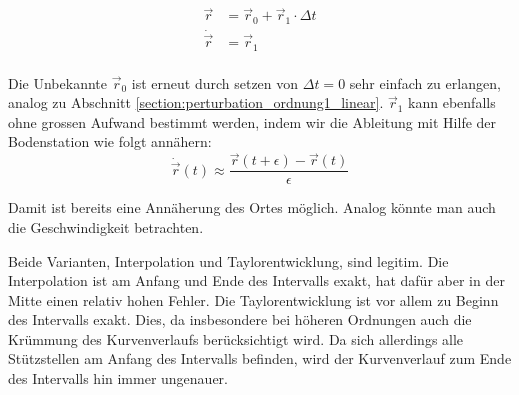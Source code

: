 \begin{equation}
\label{eq:ordnung1_taylor_ansatz}
\begin{aligned}
\vec{r} &=  \vec{r}_0 + \vec{r}_1 \cdot \Delta t \\
\dot{\vec{r}} &= \vec{r}_1 \\
\end{aligned}
\end{equation}

Die Unbekannte $\vec{r}_0$ ist erneut durch setzen von $\Delta t = 0$ sehr einfach zu erlangen, analog zu Abschnitt \ref{section:perturbation_ordnung1_linear}.
$\vec{r}_1$ kann ebenfalls ohne grossen Aufwand bestimmt werden, indem wir die Ableitung mit Hilfe der Bodenstation wie folgt annähern:
\[
\dot{\vec{r}}(t) \approx \frac{\vec{r}(t+\epsilon) - \vec{r}(t)}{\epsilon}
\]

Damit ist bereits eine Annäherung des Ortes möglich.
Analog könnte man auch die Geschwindigkeit betrachten.

Beide Varianten, Interpolation und Taylorentwicklung, sind legitim.
Die Interpolation ist am Anfang und Ende des Intervalls exakt, hat dafür aber in der Mitte einen relativ hohen Fehler.
Die Taylorentwicklung ist vor allem zu Beginn des Intervalls exakt.
Dies, da insbesondere bei höheren Ordnungen auch die Krümmung des Kurvenverlaufs berücksichtigt wird.
Da sich allerdings alle Stützstellen am Anfang des Intervalls befinden, wird der Kurvenverlauf zum Ende des Intervalls hin immer ungenauer.
